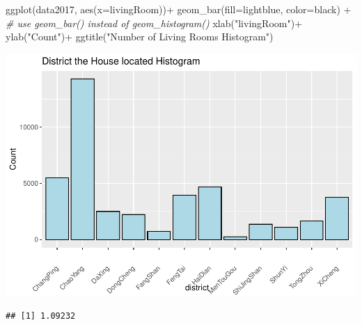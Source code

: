 \documentclass[
]{article}
\newenvironment{Shaded}{\begin{snugshade}}{\end{snugshade}}
\newcommand{\AttributeTok}[1]{\textcolor[rgb]{0.77,0.63,0.00}{#1}}
\newcommand{\CommentTok}[1]{\textcolor[rgb]{0.56,0.35,0.01}{\textit{#1}}}
\newcommand{\DecValTok}[1]{\textcolor[rgb]{0.00,0.00,0.81}{#1}}
\newcommand{\FloatTok}[1]{\textcolor[rgb]{0.00,0.00,0.81}{#1}}
\newcommand{\FunctionTok}[1]{\textcolor[rgb]{0.00,0.00,0.00}{#1}}
\newcommand{\NormalTok}[1]{#1}
\newcommand{\SpecialCharTok}[1]{\textcolor[rgb]{0.00,0.00,0.00}{#1}}
\newcommand{\StringTok}[1]{\textcolor[rgb]{0.31,0.60,0.02}{#1}}
\begin{document}
\begin{Shaded}
\begin{Highlighting}[]
\FunctionTok{ggplot}\NormalTok{(data2017, }\FunctionTok{aes}\NormalTok{(}\AttributeTok{x=}\NormalTok{livingRoom))}\SpecialCharTok{+}
  \FunctionTok{geom\_bar}\NormalTok{(}\AttributeTok{fill=}\StringTok{\textquotesingle{}lightblue\textquotesingle{}}\NormalTok{, }\AttributeTok{color=}\StringTok{\textquotesingle{}black\textquotesingle{}}\NormalTok{) }\SpecialCharTok{+} \CommentTok{\# use geom\_bar() instead of geom\_histogram()}
  \FunctionTok{xlab}\NormalTok{(}\StringTok{"livingRoom"}\NormalTok{)}\SpecialCharTok{+}
  \FunctionTok{ylab}\NormalTok{(}\StringTok{"Count"}\NormalTok{)}\SpecialCharTok{+}
  \FunctionTok{ggtitle}\NormalTok{(}\StringTok{"Number of Living Rooms Histogram"}\NormalTok{)}
\end{Highlighting}
\end{Shaded}

\includegraphics{Project_files/figure-latex/unnamed-chunk-21-1.pdf}

\begin{Shaded}
\end{Shaded}

\begin{verbatim}
## [1] 1.09232
\end{verbatim}

\begin{Shaded}
\end{Shaded}
\end{document}
